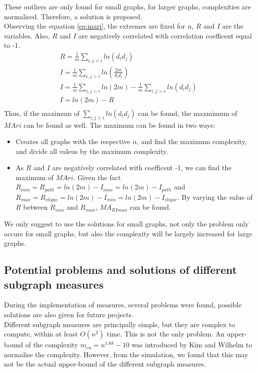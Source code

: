\documentclass[12pt]{article}
\begin{document}
\noindent
These outliers are only found for small graphs, for larger graphs, complexities are normalised. Therefore, a solution is proposed.\\
Observing the equation \ref{eq:mari}, the extremes are fixed for $n$, $R$ and $I$ are the variables. Also, $R$ and $I$ are negatively correlated with correlation coefficent equal to -1.\\
\begin{equation}
    \label{eq:ricorrelation}
    \begin{gathered}
        R = \frac{1}{m}\sum_{i,j>i}ln(d_id_j)\\
        I = \frac{1}{m}\sum_{i,j>i}ln(\frac{2m}{d_id_j})\\
        I = \frac{1}{m}\sum_{i,j>i}ln(2m)-\frac{1}{m}\sum_{i,j>i}ln(d_id_j)\\
        I = ln(2m)-R\\
    \end{gathered}
\end{equation}
Thus, if the maximum of $\sum_{i,j>i}ln(d_id_j)$ can be found, the maxmimum of $MAri$ can be found as well. The maximum can be found in two ways:\\
\begin{itemize}
    \item Creates all graphs with the respective $n$, and find the maximum complexity, and divide all valeus by the maximum complexity.
    \item As $R$ and $I$ are negatively correlated with coefficent -1, we can find the maximum of $MAri$. Given the fact $R_{min} = R_{path} = ln(2m)-I_{max} = ln(2m)-I_{path}$ and $R_{max} = R_{clique} = ln(2m)-I_{min} = ln(2m)-I_{clique}$. By varying the value of $R$ between $R_{min}$ and $R_{max}$, $MA_{RImax}$ can be found.
\end{itemize}
We only suggest to use the solutions for small graphs, not only the problem only occurs for small graphs, but also the complexity will be largely increased for large graphs.\\
\subsection{Potential problems and solutions of different subgraph measures}
During the implementation of measures, several problems were found, possible solutions are also given for future projects.\\
Different subgraph measures are principally simple, but they are complex to compute, within at least $O(n^2)$ time\cite{KIM20082637}. This is not the only problem. An upper-bound of the complexity $m_{cu} = n^{1.68}-10$ was introduced by Kim and Wilhelm\cite{KIM20082637} to normalise the complexity. However, from the simulation, we found that this may not be the actual upper-bound of the different subgraph measures.
\end{document}
